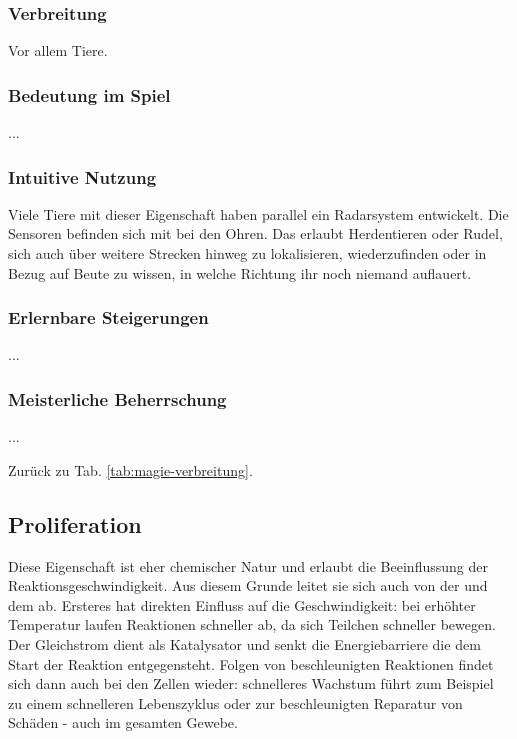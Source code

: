 \subsubsection{Verbreitung}
Vor allem Tiere.

\subsubsection{Bedeutung im Spiel}
...

\subsubsection{Intuitive Nutzung}
Viele Tiere mit dieser Eigenschaft haben parallel ein Radarsystem entwickelt.
Die Sensoren befinden sich mit bei den Ohren.
Das erlaubt Herdentieren oder Rudel, sich auch über weitere Strecken hinweg zu lokalisieren, wiederzufinden oder in Bezug auf Beute zu wissen, in welche Richtung ihr noch niemand auflauert.

\subsubsection{Erlernbare Steigerungen}
\begin{outline}
	\1 ...
\end{outline}

\subsubsection{Meisterliche Beherrschung} 
\begin{outline}
	\1 ...
\end{outline}
Zurück zu Tab. \ref{tab:magie-verbreitung}.



\subsection{Proliferation}\label{sec:proliferationsmagie}
Diese Eigenschaft ist eher chemischer Natur und erlaubt die Beeinflussung der Reaktionsgeschwindigkeit.
Aus diesem Grunde leitet sie sich auch von der  und dem  ab.
Ersteres hat direkten Einfluss auf die Geschwindigkeit: bei erhöhter Temperatur laufen Reaktionen schneller ab, da sich Teilchen schneller bewegen.
Der Gleichstrom dient als Katalysator und senkt die Energiebarriere die dem Start der Reaktion entgegensteht.
Folgen von beschleunigten Reaktionen findet sich dann auch bei den Zellen wieder: schnelleres Wachstum führt zum Beispiel zu einem schnelleren Lebenszyklus oder zur beschleunigten Reparatur von Schäden - auch im gesamten Gewebe.

